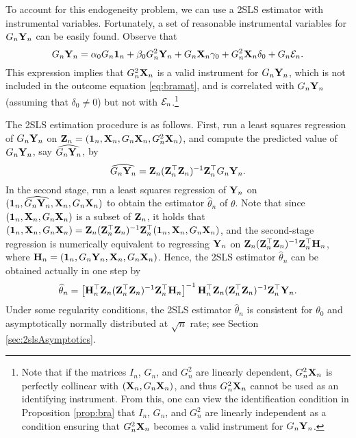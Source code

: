 \documentclass[11pt, A4paper, openany, uplatex]{book}
\begin{document}
To account for this endogeneity problem, we can use a 2SLS estimator with instrumental variables.
Fortunately, a set of reasonable instrumental variables for $G_n\mathbf{Y}_n$ can be easily found.
Observe that
\[
	G_n \mathbf{Y}_n = \alpha_0 G_n \mathbf{1}_n + \beta_0 G^2_n \mathbf{Y}_n + G_n \mathbf{X}_n \gamma_0 +  G^2_n \mathbf{X}_n \delta_0 + G_n \mathcal{E}_n.
\]
This expression implies that $G^2_n \mathbf{X}_n$ is a valid instrument for $G_n\mathbf{Y}_n$, which is not included in the outcome equation \eqref{eq:bramat}, and is correlated with $G_n\mathbf{Y}_n$ (assuming that $\delta_0 \neq 0$) but not with $\mathcal{E}_n$.\footnote{
	Note that if the matrices $I_n$, $G_n$, and $G_n^2$ are linearly dependent, $G^2_n \mathbf{X}_n$ is perfectly collinear with $(\mathbf{X}_n, G_n\mathbf{X}_n)$, and thus $G^2_n \mathbf{X}_n$ cannot be used as an identifying instrument.
	From this, one can view the identification condition in Proposition \ref{prop:bra} that $I_n$, $G_n$, and $G_n^2$ are linearly independent as a condition ensuring that $G^2_n \mathbf{X}_n$ becomes a valid instrument for $G_n\mathbf{Y}_n$.
}

The 2SLS estimation procedure is as follows.
First, run a least squares regression of $G_n \mathbf{Y}_n$ on $\mathbf{Z}_n = (\mathbf{1}_n, \mathbf{X}_n, G_n\mathbf{X}_n, G_n^2\mathbf{X}_n)$, and compute the predicted value of $G_n\mathbf{Y}_n$, say $\widehat{G_n\mathbf{Y}_n}$, by
\[
\widehat{G_n\mathbf{Y}_n} = \mathbf{Z}_n(\mathbf{Z}_n^\top \mathbf{Z}_n)^{-1}\mathbf{Z}_n^\top G_n \mathbf{Y}_n.
\]
In the second stage,  run a least squares regression of $\mathbf{Y}_n$ on $(\mathbf{1}_n, \widehat{G_n\mathbf{Y}_n}, \mathbf{X}_n, G_n\mathbf{X}_n)$ to obtain the estimator $\hat \theta_n$ of $\theta$.
Note that since $(\mathbf{1}_n, \mathbf{X}_n, G_n\mathbf{X}_n)$ is a subset of $\mathbf{Z}_n$, it holds that $(\mathbf{1}_n, \mathbf{X}_n, G_n\mathbf{X}_n) = \mathbf{Z}_n(\mathbf{Z}_n^\top \mathbf{Z}_n)^{-1}\mathbf{Z}_n^\top (\mathbf{1}_n, \mathbf{X}_n, G_n\mathbf{X}_n)$, and the second-stage regression is numerically equivalent to regressing $\mathbf{Y}_n$ on $\mathbf{Z}_n(\mathbf{Z}_n^\top \mathbf{Z}_n)^{-1}\mathbf{Z}_n^\top \mathbf{H}_n$, where $\mathbf{H}_n = (\mathbf{1}_n, G_n\mathbf{Y}_n, \mathbf{X}_n, G_n\mathbf{X}_n)$.
Hence, the 2SLS estimator $\hat \theta_n$ can be obtained actually in one step by
\begin{align}\label{eq:2slssoc}
\widehat \theta_n = \left[\mathbf{H}_n^\top \mathbf{Z}_n(\mathbf{Z}_n^\top \mathbf{Z}_n)^{-1}\mathbf{Z}_n^\top \mathbf{H}_n  \right]^{-1}\mathbf{H}_n^\top \mathbf{Z}_n(\mathbf{Z}_n^\top \mathbf{Z}_n)^{-1}\mathbf{Z}_n^\top\mathbf{Y}_n.
\end{align}
Under some regularity conditions, the 2SLS estimator $\hat \theta_n$ is consistent for $\theta_0$ and asymptotically normally distributed at $\sqrt{n}$ rate; see Section \ref{sec:2slsAsymptotics}.
\end{document}

